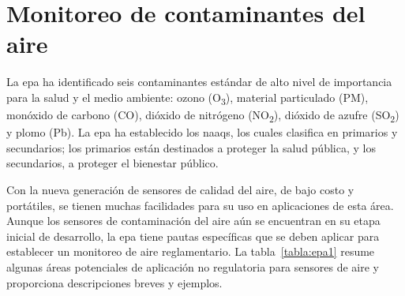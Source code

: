 \section{Monitoreo de contaminantes del aire}

La \gls{epa} ha identificado seis contaminantes estándar de alto nivel de importancia para la salud y el medio ambiente: ozono (O\textsubscript{3}), material particulado (PM), monóxido de carbono (CO), dióxido de nitrógeno (NO\textsubscript{2}), dióxido de azufre (SO\textsubscript{2}) y plomo (Pb). La \gls{epa} ha establecido los \gls{naaqs}, los cuales clasifica en primarios y secundarios; los primarios están destinados a proteger la salud pública, y los secundarios, a proteger el bienestar público.

Con la nueva generación de sensores de calidad del aire, de bajo costo y portátiles, se tienen muchas facilidades para su uso en aplicaciones de esta área. Aunque los sensores de contaminación del aire aún se encuentran en su etapa inicial de desarrollo, la \gls{epa} tiene pautas específicas que se deben aplicar para establecer un monitoreo de aire reglamentario. La tabla~\ref{tabla:epa1} resume algunas áreas potenciales de aplicación no regulatoria para sensores de aire y proporciona descripciones breves y ejemplos.


